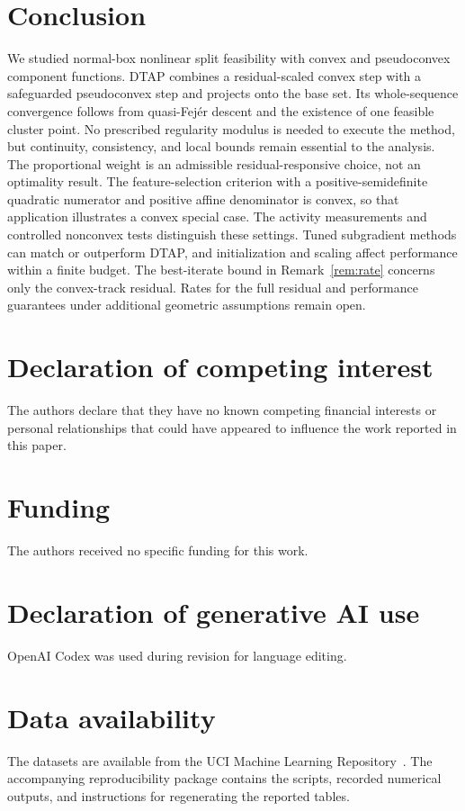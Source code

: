 \documentclass[]{interact}
\theoremstyle{plain}
\theoremstyle{definition}
\theoremstyle{remark}
\begin{document}
\section{Conclusion}\label{sec:conclusion}
We studied normal-box nonlinear split feasibility with convex and pseudoconvex component functions. DTAP combines a residual-scaled convex step with a safeguarded pseudoconvex step and projects onto the base set. Its whole-sequence convergence follows from quasi-Fej\'er descent and the existence of one feasible cluster point. No prescribed regularity modulus is needed to execute the method, but continuity, consistency, and local bounds remain essential to the analysis. The proportional weight is an admissible residual-responsive choice, not an optimality result. The feature-selection criterion with a positive-semidefinite quadratic numerator and positive affine denominator is convex, so that application illustrates a convex special case. The activity measurements and controlled nonconvex tests distinguish these settings. Tuned subgradient methods can match or outperform DTAP, and initialization and scaling affect performance within a finite budget. The best-iterate bound in Remark~\ref{rem:rate} concerns only the convex-track residual. Rates for the full residual and performance guarantees under additional geometric assumptions remain open.

\section*{Declaration of competing interest}
The authors declare that they have no known competing financial interests or personal relationships that could have appeared to influence the work reported in this paper.
\section*{Funding}
The authors received no specific funding for this work.
\section*{Declaration of generative AI use}
OpenAI Codex was used during revision for language editing.
\section*{Data availability}
The datasets are available from the UCI Machine Learning Repository~\citep{kelly2023uci}. The accompanying reproducibility package contains the scripts, recorded numerical outputs, and instructions for regenerating the reported tables.
\end{document}
